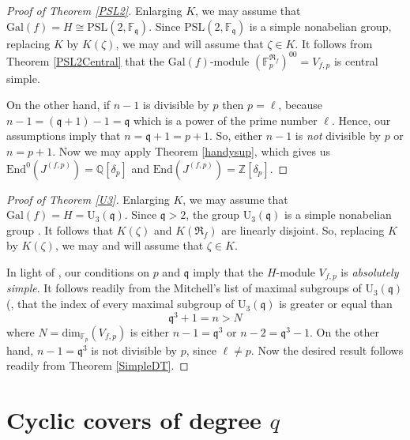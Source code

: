 \documentclass[12pt,a4paper,reqno]{amsart}
\def\Q{{\mathbb Q}}
\def\Z{{\mathbb Z}}
\def\R{{\mathbb R}}
\def\F{{\mathbb F}}
\def\R{{\mathfrak R}}
\def\Gal{\mathrm{Gal}}
\def\End{\mathrm{End}}
\def\dim{\mathrm{dim}}
\theoremstyle{definition}
\begin{document}
\begin{proof}[Proof of Theorem \ref{PSL2}]
Enlarging $K$, we may assume that $\Gal(f) =H\cong \mathrm{PSL}(2,\F_\mathfrak{q})$.
Since $\mathrm{PSL}(2,\F_\mathfrak{q})$ is a simple nonabelian group, replacing $K$ by $K(\zeta)$, we may and will assume that $\zeta \in K$.
It follows from Theorem \ref{PSL2Central} that the $\Gal(f)$-module $(\F_p^{\R_f})^{00}=V_{f,p}$ is central simple.

On the other hand, if $n-1$ is divisible by $p$ then $p=\ell$, because $n-1=(\mathfrak{q}+1)-1=\mathfrak{q}$ which  is a power of the prime number $\ell$.
Hence, our assumptions imply that $n=\mathfrak{q}+1=p+1$.  So, either  $n-1$ is {\sl not} divisible by $p$ or $n=p+1$.
Now we may apply Theorem \ref{handysup}, which gives us
$\End^0(J^{(f,p)})=\Q[\delta_p]$ and $\End(J^{(f,p)})=\Z[\delta_p]$.
\end{proof}

 \begin{proof}[Proof of Theorem \ref{U3}]
 Enlarging $K$, we may assume that $\Gal(f) =H=\mathrm{U}_3(\mathfrak{q})$.
 Since $\mathfrak{q}>2$, the group $\mathrm{U}_3(\mathfrak{q})$ is a simple nonabelian group
 \cite{Hofer}. It follows that $K(\zeta)$ and $K(\R_f)$ are linearly disjoint. So, 
  replacing $K$ by $K(\zeta)$, we may and will assume that $\zeta \in K$.
  
  In light of \cite[Table 1]{Mortimer}, our conditions on $p$ and $\mathfrak{q}$ imply that the $H$-module $V_{f,p}$ is {\sl absolutely simple}.  It follows readily from the Mitchell's list of maximal subgroups of $\mathrm{U}_3(\mathfrak{q})$ (\cite[p. 212-213]{Hofer}, \cite[Th. 6.5.3 and its proof, pp. 329-332]{Gorenstein}  that the index of every maximal subgroup of  $\mathrm{U}_3(\mathfrak{q})$ is greater or equal than
  $$\mathfrak{q}^3+1 =n>N$$
  where $N=\dim_{\F_p}(V_{f,p})$ is either $n-1=\mathfrak{q}^3$ or $n-2=\mathfrak{q}^3-1$.
  On the other hand,  $n-1=\mathfrak{q}^3$ is not divisible by $p$, since $\ell \ne p$.
  Now the desired result follows readily from  Theorem \ref{SimpleDT}.
  
 
 \end{proof}
 
 
\section{Cyclic covers of degree $q$}
\label{mainQproof}
\end{document}
